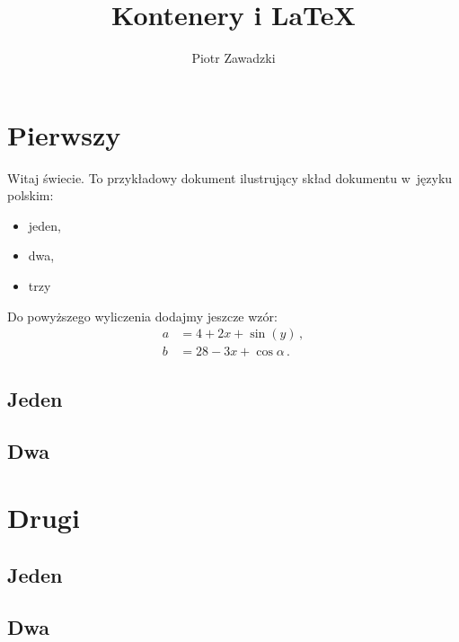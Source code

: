 \documentclass{article}
\author{Piotr Zawadzki}
\title{Kontenery i \LaTeX}
\begin{document}
\maketitle{}

\tableofcontents{}

\section{Pierwszy}

Witaj świecie. To przykładowy dokument ilustrujący skład dokumentu w~języku polskim:
\begin{itemize}
  \item jeden,
  \item dwa,
  \item trzy
\end{itemize}
Do powyższego wyliczenia dodajmy jeszcze wzór:
\begin{align}
  a & = 4+2x+\sin(y) \,,         \\
  b & = 28 -3 x + \cos\alpha \,.
\end{align}

\subsection{Jeden} \lipsum{}

\subsection{Dwa} \lipsum{}

\section{Drugi} \lipsum{}

\subsection{Jeden} \lipsum{}

\subsection{Dwa} \lipsum{}
\end{document}
